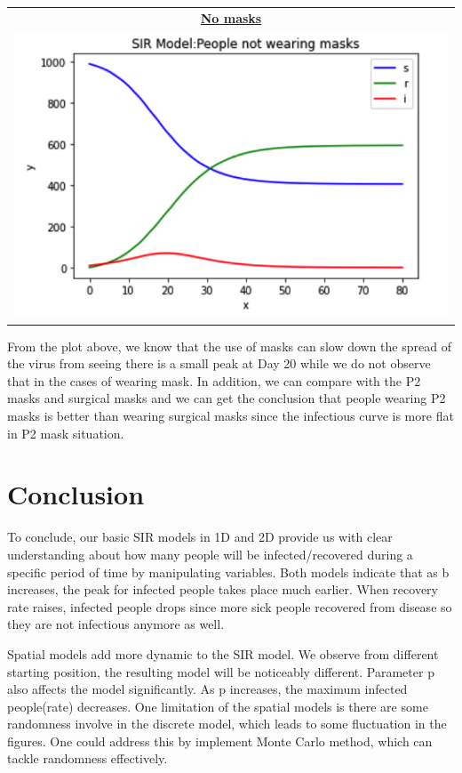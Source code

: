 \documentclass[11pt,a4paper]{article}
\begin{document}
\begin{center}
    \begin{tabular}{c}
    	\textbf{\underline{No masks}}  \\
	\includegraphics[scale=0.8]{nomask.png}
\end{tabular}
\end{center}
From the plot above, we know that the use of masks can slow down the spread of the virus from seeing there is a small peak at Day 20 while we do not observe that in the cases of wearing mask. In addition, we can compare with the P2 masks and surgical masks and we can get the conclusion that people wearing P2 masks is better than wearing surgical masks since the infectious curve is more flat in P2 mask situation.

\section*{Conclusion}	
To conclude, our basic SIR models in 1D and 2D provide us with clear understanding about how many people will be infected/recovered during a specific period of time by manipulating variables. Both models indicate that as b increases, the peak for infected people takes place much earlier. When recovery rate raises, infected people drops since more sick people recovered from disease so they are not infectious anymore as well. 

\medskip \noindent
Spatial models add more dynamic to the SIR model. We observe from different starting position, the resulting model will be noticeably different. Parameter p also affects the model significantly. As p increases, the maximum infected people(rate) decreases. One limitation of the spatial models is there are some randomness involve in the discrete model, which leads to some fluctuation in the figures. One could address this by implement Monte Carlo method, which can tackle randomness effectively. 
\end{document}
